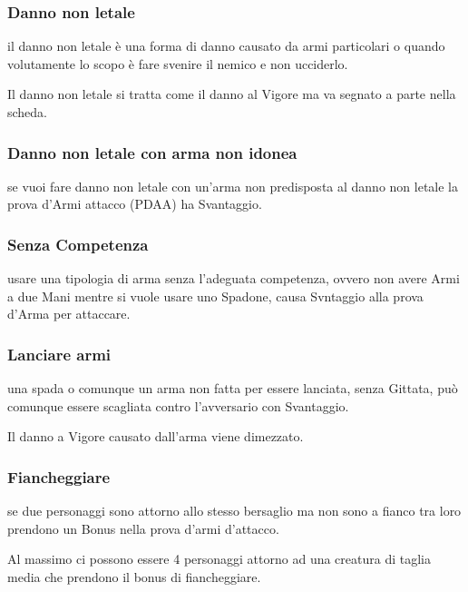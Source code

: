 \documentclass[12pt,a4paper,twoside,openany]{book}
\begin{document}
\begin{multicols}{2}
\subsubsection{Danno non letale}\label{dannononletale}

il danno non letale è una forma di danno causato da armi particolari o quando volutamente lo scopo è fare svenire il nemico e non ucciderlo.

Il danno non letale si tratta come il danno al Vigore ma va segnato a parte nella scheda.

\subsubsection{Danno non letale con arma non idonea} \label{dannononletalearmanonidonea}

se vuoi fare danno non letale con un'arma non predisposta al danno non letale la prova d'Armi attacco (PDAA) ha Svantaggio.

\subsubsection{Senza Competenza}\label{senzacompetenza}

usare una tipologia di arma senza l'adeguata competenza, ovvero non avere Armi a due Mani mentre si vuole usare uno Spadone, causa Svntaggio alla prova d'Arma per attaccare.

\subsubsection{Lanciare armi} \label{lanciarearmi}

una spada o comunque un arma non fatta per essere lanciata, senza Gittata, può comunque essere scagliata contro l'avversario con Svantaggio.

Il danno a Vigore causato dall'arma viene dimezzato.

\subsubsection{Fiancheggiare} \label{fiancheggiare}

se due personaggi sono attorno allo stesso bersaglio ma non sono a fianco tra loro prendono un Bonus nella prova d'armi d'attacco.

Al massimo ci possono essere 4 personaggi attorno ad una creatura di taglia media che prendono il bonus di fiancheggiare.


\end{multicols}
\end{document}

